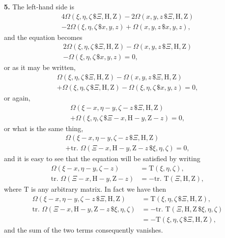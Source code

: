\documentclass[11pt,a4paper]{book}
\begin{document}
\begin{center}
\medskip
\noindent\textbf{5.} The left-hand side is
\begin{multline*}
4\Omega(\xi,\eta,\zeta\,\$\Xi,\mathrm{H},\mathrm{Z})
- 2\Omega(x,y,z\,\$\Xi,\mathrm{H},\mathrm{Z}) \\
- 2\Omega(\xi,\eta,\zeta\,\$x,y,z)
+ \Omega(x,y,z\,\$x,y,z),
\end{multline*}
and the equation becomes
\begin{multline*}
2\Omega(\xi,\eta,\zeta\,\$\Xi,\mathrm{H},\mathrm{Z})
- \Omega(x,y,z\,\$\Xi,\mathrm{H},\mathrm{Z}) \\
- \Omega(\xi,\eta,\zeta\,\$x,y,z) = 0,
\end{multline*}
or as it may be written,
\begin{multline*}
\Omega(\xi,\eta,\zeta\,\$\Xi,\mathrm{H},\mathrm{Z})
- \Omega(x,y,z\,\$\Xi,\mathrm{H},\mathrm{Z}) \\
+ \Omega(\xi,\eta,\zeta\,\$\Xi,\mathrm{H},\mathrm{Z})
- \Omega(\xi,\eta,\zeta\,\$x,y,z) = 0,
\end{multline*}
or again,
\begin{multline*}
\Omega(\xi-x, \eta-y, \zeta-z\,\$\Xi,\mathrm{H},\mathrm{Z}) \\
+ \Omega(\xi,\eta,\zeta\,\$\Xi-x, \mathrm{H}-y, \mathrm{Z}-z) = 0,
\end{multline*}
or what is the same thing,
\begin{multline*}
\Omega(\xi-x, \eta-y, \zeta-z\,\$\Xi,\mathrm{H},\mathrm{Z}) \\
+ \text{tr. }\Omega(\Xi-x, \mathrm{H}-y, \mathrm{Z}-z\,\$\xi,\eta,\zeta) = 0,
\end{multline*}
and it is easy to see that the equation will be satisfied by writing
\begin{align*}
\Omega(\xi-x, \eta-y, \zeta-z) &= \mathrm{T}(\xi,\eta,\zeta), \\
\text{tr. }\Omega(\Xi-x, \mathrm{H}-y, \mathrm{Z}-z) &= -\text{tr. }\mathrm{T}(\Xi,\mathrm{H},\mathrm{Z}),
\end{align*}
where $\mathrm{T}$ is any arbitrary matrix. In fact we have then
\begin{align*}
\Omega(\xi-x, \eta-y, \zeta-z\,\$\Xi,\mathrm{H},\mathrm{Z})
&= \mathrm{T}(\xi,\eta,\zeta\,\$\Xi,\mathrm{H},\mathrm{Z}), \\
\text{tr. }\Omega(\Xi-x, \mathrm{H}-y, \mathrm{Z}-z\,\$\xi,\eta,\zeta)
&= -\text{tr. }\mathrm{T}(\Xi,\mathrm{H},\mathrm{Z}\,\$\xi,\eta,\zeta) \\
&= -\mathrm{T}(\xi,\eta,\zeta\,\$\Xi,\mathrm{H},\mathrm{Z}),
\end{align*}
and the sum of the two terms consequently vanishes.


\end{center}
\end{document}
